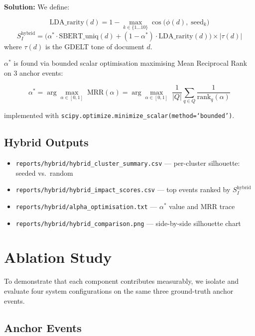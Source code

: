 \documentclass[12pt,a4paper]{article}
\begin{document}
\textbf{Solution:} We define:

\begin{formulabox}
\[
\text{LDA\_rarity}(d) = 1 - \max_{k \in \{1\ldots10\}} \cos\!\bigl(\phi(d),\; \text{seed}_k\bigr)
\]
\[
S_I^{\text{hybrid}} = \bigl(\alpha^*\!\cdot\!\text{SBERT\_uniq}(d) + (1{-}\alpha^*)\!\cdot\!\text{LDA\_rarity}(d)\bigr) \times |\tau(d)|
\]
where $\tau(d)$ is the GDELT tone of document $d$.
\end{formulabox}

$\alpha^*$ is found via bounded scalar optimisation maximising Mean Reciprocal Rank
on 3 anchor events:

\[
\alpha^* = \arg\max_{\alpha \in [0,1]}\; \text{MRR}(\alpha)
         = \arg\max_{\alpha \in [0,1]}\; \frac{1}{|Q|}\sum_{q\in Q} \frac{1}{\text{rank}_q(\alpha)}
\]

implemented with \texttt{scipy.optimize.minimize\_scalar(method=`bounded')}.

\subsection{Hybrid Outputs}

\begin{itemize}[leftmargin=2em]
    \item \texttt{reports/hybrid/hybrid\_cluster\_summary.csv} — per-cluster silhouette: seeded vs.\ random
    \item \texttt{reports/hybrid/hybrid\_impact\_scores.csv} — top events ranked by $S_I^{\text{hybrid}}$
    \item \texttt{reports/hybrid/alpha\_optimisation.txt} — $\alpha^*$ value and MRR trace
    \item \texttt{reports/hybrid/hybrid\_comparison.png} — side-by-side silhouette chart
\end{itemize}

\section{Ablation Study}
\label{sec:ablation}

To demonstrate that each component contributes measurably, we isolate and evaluate
four system configurations on the same three ground-truth anchor events.

\subsection{Anchor Events}
\end{document}
